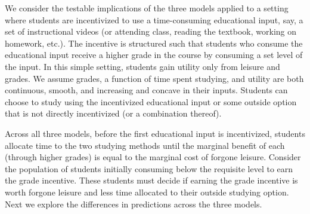 \documentclass[12pt]{article}
\begin{document}
We consider the testable implications of the three models applied to a setting where students are incentivized to use a time-consuming educational input, say, a set of instructional videos (or attending class, reading the textbook, working on homework, etc.). The incentive is structured such that students who consume the educational input receive a higher grade in the course by consuming a set level of the input. In this simple setting, students gain utility only from leisure and grades. We assume grades, a function of time spent studying, and utility are both continuous, smooth, and increasing and concave in their inputs. Students can choose to study using the incentivized educational input or some outside option that is not directly incentivized (or a combination thereof).

Across all three models, before the first educational input is incentivized, students allocate time to the two studying methods until the marginal benefit of each (through higher grades) is equal to the marginal cost of forgone leisure. Consider the population of students initially consuming below the requisite level to earn the grade incentive. These students must decide if earning the grade incentive is worth forgone leisure and less time allocated to their outside studying option. Next we explore the differences in predictions across the three models.



\end{document}
